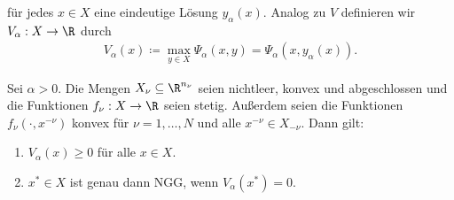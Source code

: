 für jedes $x \in X$ eine eindeutige Lösung $y_{\alpha}(x)$. Analog zu $V$ definieren wir $V_{\alpha}: X \to \R$ durch
\begin{align*}
  V_{\alpha}(x)\coloneqq \max_{y \in X} \Psi_{\alpha}(x, y) = \Psi_{\alpha}(x, y_{\alpha}(x)). 
\end{align*}
\begin{satz}\label{thm:konv}
  Sei $\alpha > 0$. Die Mengen $X_{\nu}\subseteq \R^{n_{\nu}}$ seien nichtleer, konvex und abgeschlossen und die Funktionen $f_{\nu}: X \to \R$ seien stetig. Außerdem seien die Funktionen $f_{\nu}(\cdot, x^{-\nu})$ konvex für $\nu = 1, \dots, N$ und alle $x^{-\nu} \in X_{-\nu}$. Dann gilt:
  \begin{enumerate}
  \item $V_{\alpha}(x) \geq 0$ für alle $x \in X$. 
  \item $x^{*} \in X$ ist genau dann NGG, wenn $V_{\alpha}(x^{*}) = 0$. 
  \end{enumerate}
\end{satz}
